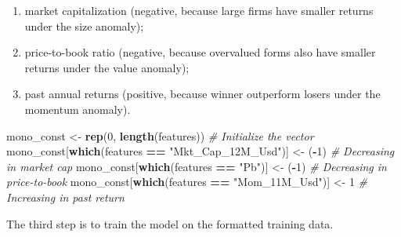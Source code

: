 \documentclass[]{krantz}
\makeatletter
\newenvironment{Shaded}{\begin{snugshade}}{\end{snugshade}}
\newcommand{\CommentTok}[1]{\textcolor[rgb]{0.37,0.37,0.37}{\textit{#1}}}
\newcommand{\DecValTok}[1]{\textcolor[rgb]{0.06,0.06,0.06}{#1}}
\newcommand{\KeywordTok}[1]{\textcolor[rgb]{0.27,0.27,0.27}{\textbf{#1}}}
\newcommand{\NormalTok}[1]{#1}
\newcommand{\OperatorTok}[1]{\textcolor[rgb]{0.43,0.43,0.43}{\textbf{#1}}}
\newcommand{\StringTok}[1]{\textcolor[rgb]{0.5,0.5,0.5}{#1}}
\providecommand{\tightlist}{%
  \setlength{\itemsep}{0pt}\setlength{\parskip}{0pt}}
\newenvironment{kframe}{%
\medskip{}
\setlength{\fboxsep}{.8em}
 \def\at@end@of@kframe{}%
 \ifinner\ifhmode%
  \def\at@end@of@kframe{\end{minipage}}%
  \begin{minipage}{\columnwidth}%
 \fi\fi%
 \def\FrameCommand##1{\hskip\@totalleftmargin \hskip-\fboxsep
 \colorbox{shadecolor}{##1}\hskip-\fboxsep
     \hskip-\linewidth \hskip-\@totalleftmargin \hskip\columnwidth}%
 \MakeFramed {\advance\hsize-\width
   \@totalleftmargin\z@ \linewidth\hsize
   \@setminipage}}%
 {\par\unskip\endMakeFramed%
 \at@end@of@kframe}
\renewenvironment{Shaded}{\begin{kframe}}{\end{kframe}}
\theoremstyle{definition}
\theoremstyle{definition}
\theoremstyle{definition}
\theoremstyle{remark}
\makeatother
\begin{document}
\begin{enumerate}
\def\labelenumi{\arabic{enumi}.}
\tightlist
\item
  market capitalization (negative, because large firms have smaller
  returns under the size anomaly);\\
\item
  price-to-book ratio (negative, because overvalued forms also have
  smaller returns under the value anomaly);\\
\item
  past annual returns (positive, because winner outperform losers under
  the momentum anomaly).
\end{enumerate}

\footnotesize

\begin{Shaded}
\begin{Highlighting}[]
\NormalTok{mono_const <-}\StringTok{ }\KeywordTok{rep}\NormalTok{(}\DecValTok{0}\NormalTok{, }\KeywordTok{length}\NormalTok{(features))                   }\CommentTok{# Initialize the vector}
\NormalTok{mono_const[}\KeywordTok{which}\NormalTok{(features }\OperatorTok{==}\StringTok{ "Mkt_Cap_12M_Usd"}\NormalTok{)] <-}\StringTok{ }\NormalTok{(}\OperatorTok{-}\DecValTok{1}\NormalTok{) }\CommentTok{# Decreasing in market cap}
\NormalTok{mono_const[}\KeywordTok{which}\NormalTok{(features }\OperatorTok{==}\StringTok{ "Pb"}\NormalTok{)] <-}\StringTok{ }\NormalTok{(}\OperatorTok{-}\DecValTok{1}\NormalTok{)              }\CommentTok{# Decreasing in price-to-book}
\NormalTok{mono_const[}\KeywordTok{which}\NormalTok{(features }\OperatorTok{==}\StringTok{ "Mom_11M_Usd"}\NormalTok{)] <-}\StringTok{ }\DecValTok{1}        \CommentTok{# Increasing in past return}
\end{Highlighting}
\end{Shaded}

\normalsize

The third step is to train the model on the formatted training data.

\footnotesize
\end{document}
